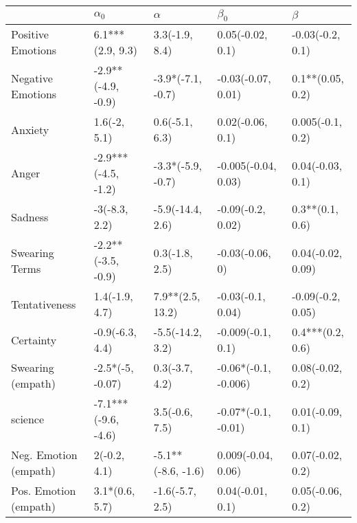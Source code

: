 \begin{tabular}{lllll}
\toprule
{} &           $\alpha_0$ &            $\alpha$ &             $\beta_0$ &            $\beta$ \\
\midrule
Positive Emotions     &     6.1***(2.9, 9.3) &      3.3(-1.9, 8.4) &      0.05(-0.02, 0.1) &   -0.03(-0.2, 0.1) \\
Negative Emotions     &   -2.9**(-4.9, -0.9) &   -3.9*(-7.1, -0.7) &    -0.03(-0.07, 0.01) &   0.1**(0.05, 0.2) \\
Anxiety               &         1.6(-2, 5.1) &      0.6(-5.1, 6.3) &      0.02(-0.06, 0.1) &   0.005(-0.1, 0.2) \\
Anger                 &  -2.9***(-4.5, -1.2) &   -3.3*(-5.9, -0.7) &   -0.005(-0.04, 0.03) &   0.04(-0.03, 0.1) \\
Sadness               &        -3(-8.3, 2.2) &    -5.9(-14.4, 2.6) &     -0.09(-0.2, 0.02) &    0.3**(0.1, 0.6) \\
Swearing Terms        &   -2.2**(-3.5, -0.9) &      0.3(-1.8, 2.5) &       -0.03(-0.06, 0) &  0.04(-0.02, 0.09) \\
Tentativeness         &       1.4(-1.9, 4.7) &    7.9**(2.5, 13.2) &     -0.03(-0.1, 0.04) &  -0.09(-0.2, 0.05) \\
Certainty             &      -0.9(-6.3, 4.4) &    -5.5(-14.2, 3.2) &     -0.009(-0.1, 0.1) &   0.4***(0.2, 0.6) \\
Swearing (empath)     &     -2.5*(-5, -0.07) &      0.3(-3.7, 4.2) &  -0.06*(-0.1, -0.006) &   0.08(-0.02, 0.2) \\
science               &  -7.1***(-9.6, -4.6) &      3.5(-0.6, 7.5) &   -0.07*(-0.1, -0.01) &   0.01(-0.09, 0.1) \\
Neg. Emotion (empath) &         2(-0.2, 4.1) &  -5.1**(-8.6, -1.6) &    0.009(-0.04, 0.06) &   0.07(-0.02, 0.2) \\
Pos. Emotion (empath) &       3.1*(0.6, 5.7) &     -1.6(-5.7, 2.5) &      0.04(-0.01, 0.1) &   0.05(-0.06, 0.2) \\
\bottomrule
\end{tabular}
